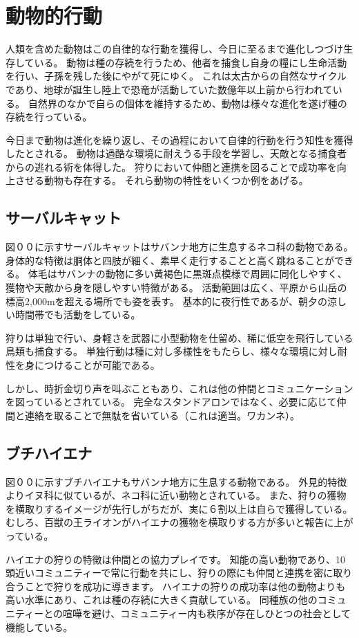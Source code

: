 \section{動物的行動}
人類を含めた動物はこの自律的な行動を獲得し、今日に至るまで進化しつづけ生存している。
動物は種の存続を行うため、他者を捕食し自身の糧にし生命活動を行い、子孫を残した後にやがて死にゆく。
これは太古からの自然なサイクルであり、地球が誕生し陸上で恐竜が活動していた数億年以上前から行われている。
自然界のなかで自らの個体を維持するため、動物は様々な進化を遂げ種の存続を行っている。
\par 今日まで動物は進化を繰り返し、その過程において自律的行動を行う知性を獲得したとされる。
動物は過酷な環境に耐えうる手段を学習し、天敵となる捕食者からの逃れる術を体得した。
狩りにおいて仲間と連携を図ることで成功率を向上させる動物も存在する。
それら動物の特性をいくつか例をあげる。
\subsection{サーバルキャット}
図００に示すサーバルキャットはサバンナ地方に生息するネコ科の動物である。
身体的な特徴は胴体と四肢が細く、素早く走行することと高く跳ねることができる。
体毛はサバンナの動物に多い黄褐色に黒斑点模様で周囲に同化しやすく、獲物や天敵から身を隠しやすい特徴がある。
活動範囲は広く、平原から山岳の標高2,000mを超える場所でも姿を表す。
基本的に夜行性であるが、朝夕の涼しい時間帯でも活動をしている。
\par 狩りは単独で行い、身軽さを武器に小型動物を仕留め、稀に低空を飛行している鳥類も捕食する。
単独行動は種に対し多様性をもたらし、様々な環境に対し耐性を身につけることが可能である。
\par しかし、時折金切り声を叫ぶこともあり、これは他の仲間とコミュニケーションを図っているとされている。
完全なスタンドアロンではなく、必要に応じて仲間と連絡を取ることで無駄を省いている（これは適当。ワカンネ）。

\subsection{ブチハイエナ}
図００に示すブチハイエナもサバンナ地方に生息する動物である。
外見的特徴よりイヌ科に似ているが、ネコ科に近い動物とされている。
また、狩りの獲物を横取りするイメージが先行しがちだが、実に６割以上は自らで獲得している。
むしろ、百獣の王ライオンがハイエナの獲物を横取りする方が多いと報告に上がっている。
\par ハイエナの狩りの特徴は仲間との協力プレイです。
知能の高い動物であり、10頭近いコミュニティーで常に行動を共にし、狩りの際にも仲間と連携を密に取り合うことで狩りを成功に導きます。
ハイエナの狩りの成功率は他の動物よりも高い水準にあり、これは種の存続に大きく貢献している。
同種族の他のコミュニティーとの喧嘩を避け、コミュニティー内も秩序が存在しひとつの社会として機能している。

